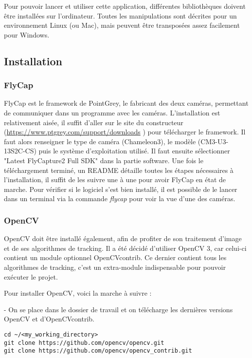 Pour pouvoir lancer et utiliser cette application, différentes bibliothèques doivent être installées sur l'ordinateur. Toutes les manipulations sont décrites pour un environnement Linux (ou Mac), mais peuvent être transposées assez facilement pour Windows.

\subsection{Installation}

\subsubsection{FlyCap}

FlyCap est le framework de PointGrey, le fabricant des deux caméras, permettant de communiquer dans un programme avec les caméras. L'installation est relativement aisée, il suffit d'aller sur le site du constructeur (\url{https://www.ptgrey.com/support/downloads} ) pour télécharger le framework. Il faut alors renseigner le type de caméra (Chameleon3), le modèle (CM3-U3-13S2C-CS) puis le système d'exploitation utilisé. Il faut ensuite sélectionner "Latest FlyCapture2 Full SDK" dans la partie software. Une fois le téléchargement terminé, un README détaille toutes les étapes nécessaires à l'installation, il suffit de les suivre une à une pour avoir FlyCap en état de marche. Pour vérifier si le logiciel s'est bien installé, il est possible de le lancer dans un terminal via la commande \textit{flycap} pour voir la vue d'une des caméras.

\subsubsection{OpenCV}

OpenCV doit être installé également, afin de profiter de son traitement d'image et de ses algorithmes de tracking. Il a été décidé d'utiliser OpenCV 3, car celui-ci contient un module optionnel OpenCV\textunderscore contrib. Ce dernier contient tous les algorithmes de tracking, c'est un extra-module indispensable pour pouvoir exécuter le projet.

Pour installer OpenCV, voici la marche à suivre :

- On se place dans le dossier de travail et on télécharge les dernières versions OpenCV  et d'OpenCV\textunderscore contrib.

\begin{verbatim}
cd ~/<my_working_directory>
git clone https://github.com/opencv/opencv.git
git clone https://github.com/opencv/opencv_contrib.git
\end{verbatim}

